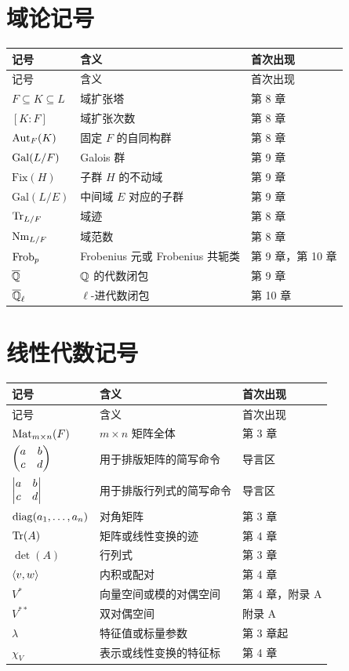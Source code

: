 \section{域论记号}

\begin{longtable}{p{}p{}p{}}
\toprule
记号 & 含义 & 首次出现 \\
\midrule
\endfirsthead
\toprule
记号 & 含义 & 首次出现 \\
\midrule
\endhead
$F\subseteq K\subseteq L$ & 域扩张塔 & 第 8 章 \\
$[K:F]$ & 域扩张次数 & 第 8 章 \\
$\mathrm{Aut}_F(K)$ & 固定 $F$ 的自同构群 & 第 8 章 \\
$\mathrm{Gal}(L/F)$ & Galois 群 & 第 9 章 \\
$\mathrm{Fix}(H)$ & 子群 $H$ 的不动域 & 第 9 章 \\
$\mathrm{Gal}(L/E)$ & 中间域 $E$ 对应的子群 & 第 9 章 \\
$\mathrm{Tr}_{L/F}$ & 域迹 & 第 8 章 \\
$\mathrm{Nm}_{L/F}$ & 域范数 & 第 8 章 \\
$\mathrm{Frob}_p$ & Frobenius 元或 Frobenius 共轭类 & 第 9 章，第 10 章 \\
$\overline{\mathbb{Q}}$ & $\mathbb{Q}$ 的代数闭包 & 第 9 章 \\
$\overline{\mathbb{Q}}_\ell$ & $\ell$-进代数闭包 & 第 10 章 \\
\bottomrule
\end{longtable}

\section{线性代数记号}

\begin{longtable}{p{}p{}p{}}
\toprule
记号 & 含义 & 首次出现 \\
\midrule
\endfirsthead
\toprule
记号 & 含义 & 首次出现 \\
\midrule
\endhead
$\mathrm{Mat}_{m\times n}(F)$ & $m\times n$ 矩阵全体 & 第 3 章 \\
$\begin{pmatrix} a&b\\c&d \end{pmatrix}$ & 用于排版矩阵的简写命令 & 导言区 \\
$\begin{vmatrix} a&b\\c&d \end{vmatrix}$ & 用于排版行列式的简写命令 & 导言区 \\
$\mathrm{diag}(a_1,\dots,a_n)$ & 对角矩阵 & 第 3 章 \\
$\mathrm{Tr}(A)$ & 矩阵或线性变换的迹 & 第 4 章 \\
$\det(A)$ & 行列式 & 第 3 章 \\
$\langle v, w \rangle$ & 内积或配对 & 第 4 章 \\
$V^*$ & 向量空间或模的对偶空间 & 第 4 章，附录 A \\
$V^{**}$ & 双对偶空间 & 附录 A \\
$\lambda$ & 特征值或标量参数 & 第 3 章起 \\
$\chi_V$ & 表示或线性变换的特征标 & 第 4 章 \\
\bottomrule
\end{longtable}

